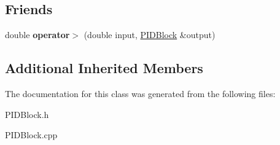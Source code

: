\subsection*{Friends}
\begin{DoxyCompactItemize}
\item 
\mbox{\label{classPIDBlock_a7c21e4973160d2d1521b4a3095b8e87a}} 
double {\bfseries operator$>$} (double input, \hyperlink{classPIDBlock}{P\+I\+D\+Block} \&output)
\end{DoxyCompactItemize}
\subsection*{Additional Inherited Members}


The documentation for this class was generated from the following files\+:\begin{DoxyCompactItemize}
\item 
P\+I\+D\+Block.\+h\item 
P\+I\+D\+Block.\+cpp\end{DoxyCompactItemize}
